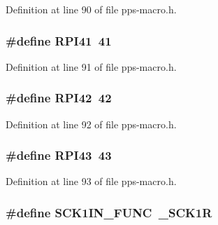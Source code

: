 Definition at line 90 of file pps-\/macro.\+h.

\hypertarget{pps-macro_8h_a174ec4b355e8b2cd35b9b7ac50e89f2c}{}
\subsubsection[{R\+P\+I41}]{\setlength{\rightskip}{0pt plus 5cm}\#define R\+P\+I41~41}\label{pps-macro_8h_a174ec4b355e8b2cd35b9b7ac50e89f2c}


Definition at line 91 of file pps-\/macro.\+h.

\hypertarget{pps-macro_8h_a241ff5b1c9997874ed443a6b9e0b0e16}{}
\subsubsection[{R\+P\+I42}]{\setlength{\rightskip}{0pt plus 5cm}\#define R\+P\+I42~42}\label{pps-macro_8h_a241ff5b1c9997874ed443a6b9e0b0e16}


Definition at line 92 of file pps-\/macro.\+h.

\hypertarget{pps-macro_8h_a65f47a3314bc470f6f797b336804c595}{}
\subsubsection[{R\+P\+I43}]{\setlength{\rightskip}{0pt plus 5cm}\#define R\+P\+I43~43}\label{pps-macro_8h_a65f47a3314bc470f6f797b336804c595}


Definition at line 93 of file pps-\/macro.\+h.

\hypertarget{pps-macro_8h_adce45eccb73e9f2f75ba6e7ef77f2d60}{}
\subsubsection[{S\+C\+K1\+I\+N\+\_\+\+F\+U\+N\+C}]{\setlength{\rightskip}{0pt plus 5cm}\#define S\+C\+K1\+I\+N\+\_\+\+F\+U\+N\+C~\+\_\+\+S\+C\+K1\+R}\label{pps-macro_8h_adce45eccb73e9f2f75ba6e7ef77f2d60}


